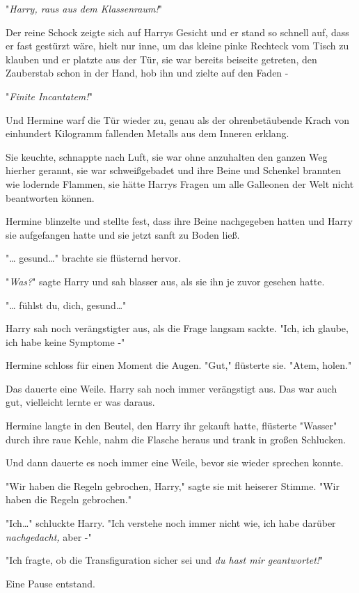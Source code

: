 {"\emph{Harry, raus aus dem Klassenraum!}"

Der reine Schock zeigte sich auf Harrys Gesicht und er stand so schnell auf, dass er fast gestürzt wäre, hielt nur inne, um das kleine pinke Rechteck vom Tisch zu klauben und er platzte aus der Tür, sie war bereits beiseite getreten, den Zauberstab schon in der Hand, hob ihn und zielte auf den Faden -

"\emph{Finite Incantatem!}"

Und Hermine warf die Tür wieder zu, genau als der ohrenbetäubende Krach von einhundert Kilogramm fallenden Metalls aus dem Inneren erklang.

Sie keuchte, schnappte nach Luft, sie war ohne anzuhalten den ganzen Weg hierher gerannt, sie war schweißgebadet und ihre Beine und Schenkel brannten wie lodernde Flammen, sie hätte Harrys Fragen um alle Galleonen der Welt nicht beantworten können.

Hermine blinzelte und stellte fest, dass ihre Beine nachgegeben hatten und Harry sie aufgefangen hatte und sie jetzt sanft zu Boden ließ.

"… gesund…" brachte sie flüsternd hervor.

"\emph{Was?}" sagte Harry und sah blasser aus, als sie ihn je zuvor gesehen hatte.

"… fühlst du, dich, gesund…"

Harry sah noch verängstigter aus, als die Frage langsam sackte. "Ich, ich glaube, ich habe keine Symptome -"

Hermine schloss für einen Moment die Augen. "Gut," flüsterte sie. "Atem, holen."

Das dauerte eine Weile. Harry sah noch immer verängstigt aus. Das war auch gut, vielleicht lernte er was daraus.

Hermine langte in den Beutel, den Harry ihr gekauft hatte, flüsterte "Wasser" durch ihre raue Kehle, nahm die Flasche heraus und trank in großen Schlucken.

Und dann dauerte es noch immer eine Weile, bevor sie wieder sprechen konnte.

"Wir haben die Regeln gebrochen, Harry," sagte sie mit heiserer Stimme. "Wir haben die Regeln gebrochen."

"Ich…" schluckte Harry. "Ich verstehe noch immer nicht wie, ich habe darüber \emph{nachgedacht,} aber -"

"Ich fragte, ob die Transfiguration sicher sei und \emph{du hast mir geantwortet!}"

Eine Pause entstand.

}
